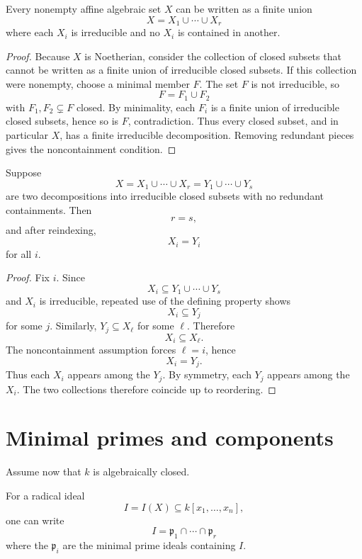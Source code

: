 \begin{theorem}
\label{thm:vi05-component-existence}
Every nonempty affine algebraic set \(X\) can be written as a finite union
\[
X=X_1\cup\cdots\cup X_r
\]
where each \(X_i\) is irreducible and no \(X_i\) is contained in another.
\end{theorem}

\begin{proof}
Because \(X\) is Noetherian, consider the collection of closed subsets that cannot be written
as a finite union of irreducible closed subsets.  If this collection were nonempty, choose a
minimal member \(F\).  The set \(F\) is not irreducible, so
\[
F=F_1\cup F_2
\]
with \(F_1,F_2\subsetneq F\) closed.  By minimality, each \(F_i\) is a finite union of
irreducible closed subsets, hence so is \(F\), contradiction.  Thus every closed subset,
and in particular \(X\), has a finite irreducible decomposition.  Removing redundant pieces
gives the noncontainment condition.
\end{proof}

\begin{theorem}
\label{thm:vi05-component-uniqueness}
Suppose
\[
X=X_1\cup\cdots\cup X_r
=
Y_1\cup\cdots\cup Y_s
\]
are two decompositions into irreducible closed subsets with no redundant containments.
Then
\[
r=s,
\]
and after reindexing,
\[
X_i=Y_i
\]
for all \(i\).
\end{theorem}

\begin{proof}
Fix \(i\).  Since
\[
X_i\subseteq Y_1\cup\cdots\cup Y_s
\]
and \(X_i\) is irreducible, repeated use of the defining property shows
\[
X_i\subseteq Y_j
\]
for some \(j\).  Similarly, \(Y_j\subseteq X_\ell\) for some \(\ell\).  Therefore
\[
X_i\subseteq X_\ell.
\]
The noncontainment assumption forces \(\ell=i\), hence
\[
X_i=Y_j.
\]
Thus each \(X_i\) appears among the \(Y_j\).  By symmetry, each \(Y_j\) appears among the
\(X_i\).  The two collections therefore coincide up to reordering.
\end{proof}

\section{Minimal primes and components}

Assume now that \(k\) is algebraically closed.

For a radical ideal
\[
I=I(X)\subseteq k[x_1,\dots,x_n],
\]
one can write
\[
I=\mathfrak p_1\cap\cdots\cap\mathfrak p_r
\]
where the \(\mathfrak p_i\) are the minimal prime ideals containing \(I\).

